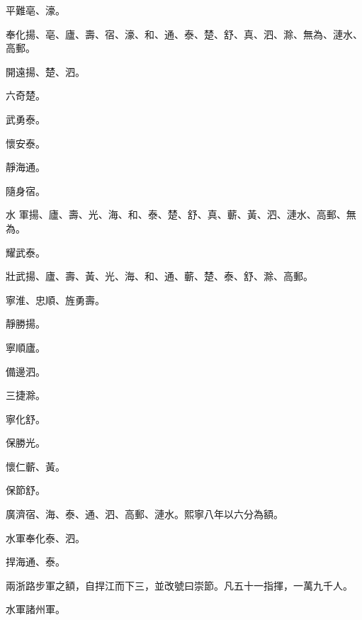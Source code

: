 \begin{pinyinscope}
 平難亳、濠。



 奉化揚、亳、廬、壽、宿、濠、和、通、泰、楚、舒、真、泗、滁、無為、漣水、高郵。



 開遠揚、楚、泗。



 六奇楚。



 武勇泰。



 懷安泰。



 靜海通。



 隨身宿。



 水
 軍揚、廬、壽、光、海、和、泰、楚、舒、真、蘄、黃、泗、漣水、高郵、無為。



 耀武泰。



 壯武揚、廬、壽、黃、光、海、和、通、蘄、楚、泰、舒、滁、高郵。



 寧淮、忠順、旌勇壽。



 靜勝揚。



 寧順廬。



 備邊泗。



 三捷滁。



 寧化舒。



 保勝光。



 懷仁蘄、黃。



 保節舒。



 廣濟宿、海、泰、通、泗、高郵、漣水。熙寧八年以六分為額。



 水軍奉化泰、泗。



 捍海通、泰。



 兩浙路步軍之額，自捍江而下三，並改號曰崇節。凡五十一指揮，一萬九千人。



 水軍諸州軍。




\end{pinyinscope}
